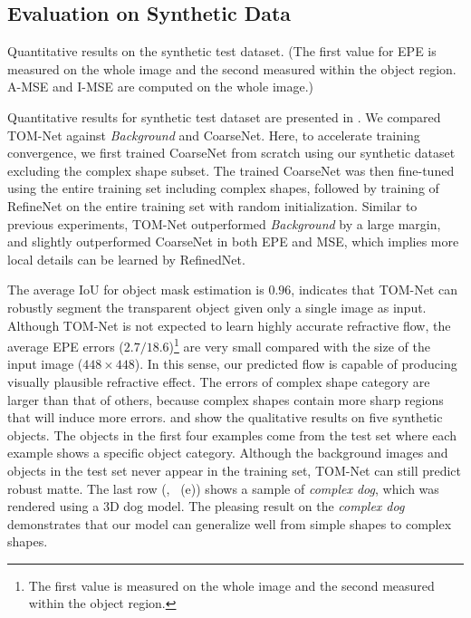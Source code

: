 \subsection{Evaluation on Synthetic Data}
\label{sub:Results on Synthetic data}
\begin{table}[htbp] \centering
    \caption[Quantitative results on the synthetic test dataset]{Quantitative results on the synthetic test dataset. (The first value for EPE is measured on the whole image and the second measured within the object region. A-MSE and I-MSE are computed on the whole image.)}
    
    \label{tab:quant_synth}
\end{table}

Quantitative results for synthetic test dataset are presented in . We compared TOM-Net against \emph{Background} and CoarseNet. Here, to accelerate training convergence, we first trained CoarseNet from scratch using our synthetic dataset excluding the complex shape subset. The trained CoarseNet was then fine-tuned using the entire training set including complex shapes, followed by training of RefineNet on the entire training set with random initialization. Similar to previous experiments, TOM-Net outperformed \emph{Background} by a large margin, and slightly outperformed CoarseNet in both EPE and MSE, which implies more local details can be learned by RefinedNet. 

The average IoU for object mask estimation is $0.96$, indicates that TOM-Net can robustly segment the transparent object given only a single image as input.
Although TOM-Net is not expected to learn highly accurate refractive flow, the average EPE errors ($2.7/18.6$)\footnote{The first value is measured on the whole image and the second measured within the object region.} are very small compared with the size of the input image ($448\times 448$). In this sense, our predicted flow is capable of producing visually plausible refractive effect. The errors of complex shape category are larger than that of others, because complex shapes contain more sharp regions that will induce more errors. 
 and  show the qualitative results on five synthetic objects. The objects in the first four examples come from the test set where each example shows a specific object category. Although the background images and objects in the test set never appear in the training set, TOM-Net can still predict robust matte.
 The last row (\ie, ~(e)) shows a sample of \emph{complex dog}, which was rendered using a 3D dog model. The pleasing result on the \emph{complex dog} demonstrates that our model can generalize well from simple shapes to complex shapes.

